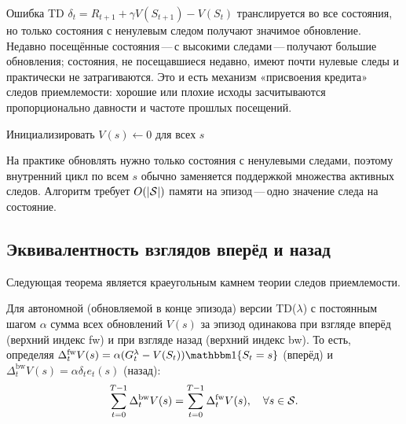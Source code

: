 Ошибка TD $\delta_t = R_{t+1}+\gamma V(S_{t+1})-V(S_t)$ транслируется во все состояния, но только состояния с ненулевым следом получают значимое обновление.  Недавно посещённые состояния\,---\,с высокими следами\,---\,получают большие обновления; состояния, не посещавшиеся недавно, имеют почти нулевые следы и практически не затрагиваются.  Это и есть механизм «присвоения кредита» следов приемлемости: хорошие или плохие исходы засчитываются пропорционально давности и частоте прошлых посещений.

\begin{algorithm}[ht]
\caption{TD($\lambda$) со следами приемлемости}
\label{alg:td-lambda}
Инициализировать $V(s)\leftarrow 0$ для всех $s$\;
\end{algorithm}

На практике обновлять нужно только состояния с ненулевыми следами, поэтому внутренний цикл по всем $s$ обычно заменяется поддержкой множества активных следов.  Алгоритм требует $O(|\mathcal{S}|)$ памяти на эпизод\,---\,одно значение следа на состояние.

\subsection{Эквивалентность взглядов вперёд и назад}

Следующая теорема является краеугольным камнем теории следов приемлемости.

\begin{theorem}
\label{thm:fb-equivalence}
Для автономной (обновляемой в конце эпизода) версии TD($\lambda$) с постоянным шагом $\alpha$ сумма всех обновлений $V(s)$ за эпизод одинакова при взгляде вперёд (верхний индекс fw) и при взгляде назад (верхний индекс bw).  То есть, определяя $\Delta_t^{\mathrm{fw}} V(s) = \alpha(G_t^\lambda - V(S_t))\ind\{S_t=s\}$ (вперёд) и $\Delta_t^{\mathrm{bw}}V(s) = \alpha\delta_t e_t(s)$ (назад):
\begin{equation}
\label{eq:fb-equiv}
\sum_{t=0}^{T-1}\Delta_t^{\mathrm{bw}}V(s) = \sum_{t=0}^{T-1}\Delta_t^{\mathrm{fw}}V(s), \quad \forall s\in\mathcal{S}.
\end{equation}
\end{theorem}

